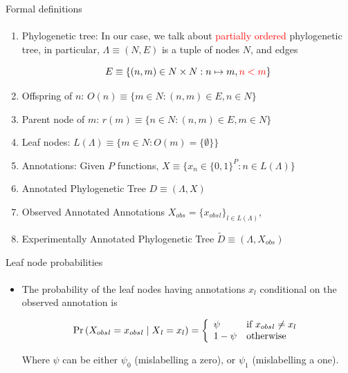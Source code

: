 \documentclass[9pt,ignorenonframetext,aspectratio=169]{beamer}
\newcommand{\Prcond}[2]{{\mbox{Pr}\left(#1\vphantom{#2}\;\right|\left.\vphantom{#1}#2\right)}}
\newcommand{\phylo}{\Lambda{}} %
\newcommand{\aphylo}{D{}}      %
\newcommand{\aphyloObs}{\tilde \aphylo{}} %
\newcommand{\Ann}{X{}} %
\newcommand{\ann}{x{}} %
\newcommand{\AnnObs}{{X_{obs}}{}}%
\newcommand{\annObs}{{x_{obs}}{}}%
\newcommand{\Leaf}{L{}}
\begin{document}
\begin{frame}[t,label=formaldef]{Formal definitions}

\framesubtitle{\hyperlink{definitions}{}}

\begin{enumerate}
\def\labelenumi{\arabic{enumi}.}
\item
  Phylogenetic tree: In our case, we talk about
  \textcolor{red}{partially ordered} phylogenetic tree, in particular,
  \(\phylo\equiv (N,E)\) is a tuple of nodes \(N\), and edges

  \[
  E\equiv \{(n, m) \in N\times N: n\mapsto m, \textcolor{red}{n < m}\}
  \]
\item
  Offspring of \(n\): \(O(n)\equiv\{m\in N: (n, m) \in E, n\in N\}\)
\item
  Parent node of \(m\): \(r(m) \equiv\{n \in N: (n, m) \in E, m\in N\}\)
\item
  Leaf nodes: \(\Leaf(\phylo)\equiv \{m \in N: O(m)=\{\emptyset\}\}\)
\item
  Annotations: Given \(P\) functions,
  \(\Ann \equiv \{\ann_n \in \{0,1\}^P: n\in \Leaf(\phylo)\}\)
\item
  Annotated Phylogenetic Tree \(\aphylo \equiv(\phylo, \Ann)\)
\item
  Observed Annotated Annotations
  \(\AnnObs = \{\annObs_l\}_{l\in \Leaf(\phylo)}\),
\item
  Experimentally Annotated Phylogenetic Tree
  \(\aphyloObs\equiv(\phylo, \AnnObs)\)
\end{enumerate}

\end{frame}

\begin{frame}[t,label=leafnodesprob]{Leaf node probabilities}

\framesubtitle{\hyperlink{peelingalgorithm}{}}

\begin{itemize}
\item
  The probability of the leaf nodes having annotations \(\ann_l\)
  conditional on the observed annotation is

  \begin{equation}
  \label{eq:leaf1}
  \Prcond{\AnnObs_{l} = \annObs_{l}}{\Ann_{l} = \ann_{l}} = \left\{
  \begin{array}{ll}
  \psi &\mbox{if }\annObs_{l} \neq \ann_{l} \\
  1 - \psi & \mbox{otherwise}
  \end{array}
  \right.
  \end{equation}

  Where \(\psi\) can be either \(\psi_0\) (mislabelling a zero), or
  \(\psi_1\) (mislabelling a one).
\end{itemize}

\end{frame}
\end{document}
